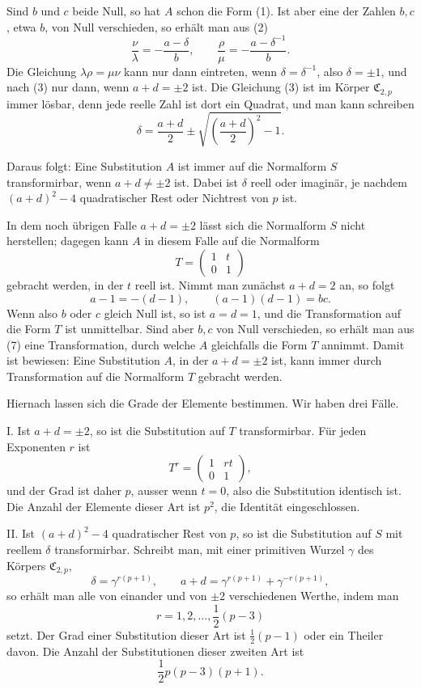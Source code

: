 \documentclass[11pt]{article}
\providecommand{\mat}[4]{\begin{pmatrix}#1&#2\\#3&#4\end{pmatrix}}
\providecommand{\mat}[4]{\begin{pmatrix}#1&#2\\#3&#4\end{pmatrix}}
\providecommand{\Cfield}{\mathfrak C}
\begin{document}
Sind $b$ und $c$ beide Null, so hat $A$ schon die Form (1). Ist aber eine der Zahlen $b,c$, etwa $b$, von Null verschieden, so erhält man aus (2)
\begin{equation}
 \frac{\nu}{\lambda}=-\frac{a-\delta}{b},\qquad
 \frac{\rho}{\mu}=-\frac{a-\delta^{-1}}{b}.
 \tag{4}
\end{equation}
Die Gleichung $\lambda\rho=\mu\nu$ kann nur dann eintreten, wenn $\delta=\delta^{-1}$, also $\delta=\pm1$, und nach (3) nur dann, wenn $a+d=\pm2$ ist. Die Gleichung (3) ist im Körper $\Cfield_{2,p}$ immer lösbar, denn jede reelle Zahl ist dort ein Quadrat, und man kann schreiben
\begin{equation}
 \delta=\frac{a+d}{2}\pm \sqrt{\left(\frac{a+d}{2}\right)^2-1}.
 \tag{5}
\end{equation}

Daraus folgt: Eine Substitution $A$ ist immer auf die Normalform $S$ transformirbar, wenn $a+d\ne\pm2$ ist. Dabei ist $\delta$ reell oder imaginär, je nachdem $(a+d)^2-4$ quadratischer Rest oder Nichtrest von $p$ ist.

In dem noch übrigen Falle $a+d=\pm2$ lässt sich die Normalform $S$ nicht herstellen; dagegen kann $A$ in diesem Falle auf die Normalform
\begin{equation}
 T=\mat{1}{t}{0}{1}
 \tag{6}
\end{equation}
gebracht werden, in der $t$ reell ist. Nimmt man zunächst $a+d=2$ an, so folgt
\begin{equation}
 a-1=-(d-1),\qquad (a-1)(d-1)=bc.
 \tag{7}
\end{equation}
Wenn also $b$ oder $c$ gleich Null ist, so ist $a=d=1$, und die Transformation auf die Form $T$ ist unmittelbar. Sind aber $b,c$ von Null verschieden, so erhält man aus (7) eine Transformation, durch welche $A$ gleichfalls die Form $T$ annimmt. Damit ist bewiesen: Eine Substitution $A$, in der $a+d=\pm2$ ist, kann immer durch Transformation auf die Normalform $T$ gebracht werden.

Hiernach lassen sich die Grade der Elemente bestimmen. Wir haben drei Fälle.

I. Ist $a+d=\pm2$, so ist die Substitution auf $T$ transformirbar. Für jeden Exponenten $r$ ist
\[
 T^r=\mat{1}{rt}{0}{1},
\]
und der Grad ist daher $p$, ausser wenn $t=0$, also die Substitution identisch ist. Die Anzahl der Elemente dieser Art ist $p^2$, die Identität eingeschlossen.

II. Ist $(a+d)^2-4$ quadratischer Rest von $p$, so ist die Substitution auf $S$ mit reellem $\delta$ transformirbar. Schreibt man, mit einer primitiven Wurzel $\gamma$ des Körpers $\Cfield_{2,p}$,
\begin{equation}
 \delta=\gamma^{r(p+1)},\qquad
 a+d=\gamma^{r(p+1)}+\gamma^{-r(p+1)},
 \tag{8}
\end{equation}
so erhält man alle von einander und von $\pm2$ verschiedenen Werthe, indem man
\begin{equation}
 r=1,2,\ldots,\frac12(p-3)
 \tag{9}
\end{equation}
setzt. Der Grad einer Substitution dieser Art ist $\frac12(p-1)$ oder ein Theiler davon. Die Anzahl der Substitutionen dieser zweiten Art ist
\[
 \frac12 p(p-3)(p+1).
\]
\end{document}
